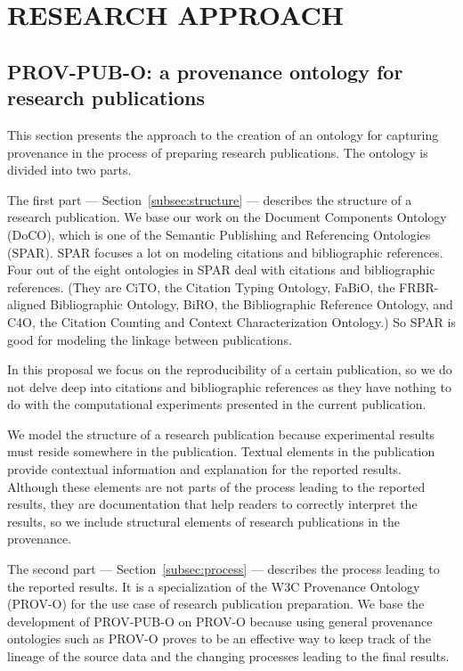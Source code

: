 \chapter{RESEARCH APPROACH}
\label{research-approach}
\section{PROV-PUB-O: a provenance ontology for research publications}
This section presents the approach to the creation of an ontology for capturing provenance in the process of preparing research publications. The ontology is divided into two parts. 

The first part --- Section~\ref{subsec:structure} --- describes the structure of a research publication. We base our work on the Document Components Ontology (DoCO), which is one of the Semantic Publishing and Referencing Ontologies (SPAR). SPAR focuses a lot on modeling citations and bibliographic references. Four out of the eight ontologies in SPAR deal with citations and bibliographic references. (They are CiTO, the Citation Typing Ontology, FaBiO, the FRBR-aligned Bibliographic Ontology, BiRO, the Bibliographic Reference Ontology, and C4O, the Citation Counting and Context Characterization Ontology.) So SPAR is good for modeling the linkage between publications. 

In this proposal we focus on the reproducibility of a certain publication, so we do not delve deep into citations and bibliographic references as they have nothing to do with the computational experiments presented in the current publication. 

We model the structure of a research publication because experimental results must reside somewhere in the publication. Textual elements in the publication provide contextual information and explanation for the reported results. Although these elements are not parts of the process leading to the reported results, they are documentation that help readers to correctly interpret the results, so we include structural elements of research publications in the provenance.

The second part --- Section~\ref{subsec:process} --- describes the process leading to the reported results. It is a specialization of the W3C Provenance Ontology (PROV-O) for the use case of research publication preparation. We base the development of PROV-PUB-O on PROV-O because using general provenance ontologies such as PROV-O proves to be an effective way to keep track of the lineage of the source data and the changing processes leading to the final results. 

